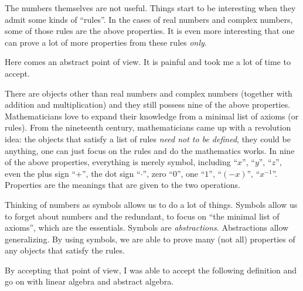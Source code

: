 \begin{note}
    The numbers themselves are not useful. Things start to be interesting when they admit some kinds of ``rules''. In the cases of real numbers and complex numbers, some of those rules are the above properties. It is even more interesting that one can prove a lot of more properties from these rules \textit{only}.

    Here comes an abstract point of view. It is painful and took me a lot of time to accept.

    There are objects other than real numbers and complex numbers (together with addition and multiplication) and they still possess nine of the above properties. Mathematicians love to expand their knowledge from a minimal list of axioms (or rules). From the nineteenth century, mathematicians came up with a revolution idea: the objects that satisfy a list of rules \textit{need not to be defined}, they could be anything, one can just focus on the rules and do the mathematics works. In nine of the above properties, everything is merely symbol, including ``$x$'', ``$y$'', ``$z$'', even the plus sign ``$+$'', the dot sign ``$\cdot$'', zero ``$0$'', one ``$1$'', ``$(-x)$'', ``$x^{-1}$''. Properties are the meanings that are given to the two operations.

    Thinking of numbers as symbols allows us to do a lot of things. Symbols allow us to forget about numbers and the redundant, to focus on ``the minimal list of axioms'', which are the essentials. Symbols are \textit{abstractions}. Abstractions allow generalizing. By using symbols, we are able to prove many (not all) properties of any objects that satisfy the rules.

    By accepting that point of view, I was able to accept the following definition and go on with linear algebra and abstract algebra.
\end{note}

